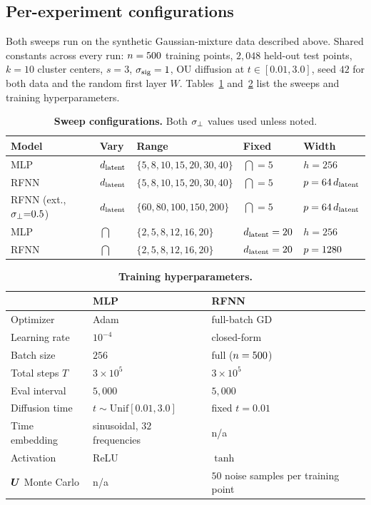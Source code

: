 \subsection{Per-experiment configurations}
\label{app:exp-configs}

Both sweeps run on the synthetic Gaussian-mixture data described
above. Shared
constants across every run: $n = 500$ training points, $2{,}048$
held-out test points, $k = 10$ cluster centers, $s = 3$, $\sigma_{\mathrm{sig}} = 1$,
OU diffusion at $t \in [0.01, 3.0]$, seed $42$ for both data and the
random first layer $W$. Tables~\ref{tab:exp-configs}
and~\ref{tab:exp-hparams} list the sweeps and training
hyperparameters.

\begin{table}[!t]
\centering\small
\setlength{\tabcolsep}{4pt}
\caption{\textbf{Sweep configurations.} Both $\sigma_{\perp}$ values used
unless noted.}
\label{tab:exp-configs}
\begin{tabular}{@{}lllll@{}}
\toprule
Model & Vary & Range & Fixed & Width \\
\midrule
MLP                       & $d_{\mathrm{latent}}$ & $\{5, 8, 10, 15, 20, 30, 40\}$ & $\dint = 5$ & $h = 256$ \\
RFNN                      & $d_{\mathrm{latent}}$ & $\{5, 8, 10, 15, 20, 30, 40\}$ & $\dint = 5$ & $p = 64\,d_{\mathrm{latent}}$ \\
RFNN (ext., $\sigma_{\perp}{=}0.5$) & $d_{\mathrm{latent}}$ & $\{60, 80, 100, 150, 200\}$ & $\dint = 5$ & $p = 64\,d_{\mathrm{latent}}$ \\
MLP                       & $\dint$ & $\{2, 5, 8, 12, 16, 20\}$ & $d_{\mathrm{latent}} = 20$ & $h = 256$ \\
RFNN                      & $\dint$ & $\{2, 5, 8, 12, 16, 20\}$ & $d_{\mathrm{latent}} = 20$ & $p = 1280$ \\
\bottomrule
\end{tabular}
\end{table}

\begin{table}[!t]
\centering\small
\setlength{\tabcolsep}{6pt}
\caption{\textbf{Training hyperparameters.}}
\label{tab:exp-hparams}
\begin{tabular}{@{}lll@{}}
\toprule
 & MLP & RFNN \\
\midrule
Optimizer & Adam & full-batch GD \\
Learning rate & $10^{-4}$ & closed-form \\
Batch size & $256$ & full ($n = 500$) \\
Total steps $T$ & $3 \times 10^5$ & $3 \times 10^5$ \\
Eval interval & $5{,}000$ & $5{,}000$ \\
Diffusion time & $t \sim \mathrm{Unif}[0.01, 3.0]$ & fixed $t = 0.01$ \\
Time embedding & sinusoidal, $32$ frequencies & n/a\\
Activation & ReLU & $\tanh$ \\
$\bm{U}$ Monte Carlo & n/a& $50$ noise samples per training point \\
\bottomrule
\end{tabular}
\end{table}

